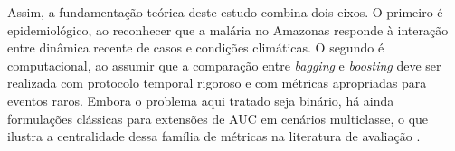 Assim, a fundamenta\c{c}\~ao te\'orica deste estudo combina dois eixos. O primeiro \'e epidemiol\'ogico, ao reconhecer que a mal\'aria no Amazonas responde \`a intera\c{c}\~ao entre din\^amica recente de casos e condi\c{c}\~oes clim\'aticas. O segundo \'e computacional, ao assumir que a compara\c{c}\~ao entre \textit{bagging} e \textit{boosting} deve ser realizada com protocolo temporal rigoroso e com m\'etricas apropriadas para eventos raros. Embora o problema aqui tratado seja bin\'ario, h\'a ainda formula\c{c}\~oes cl\'assicas para extens\~oes de AUC em cen\'arios multiclasse, o que ilustra a centralidade dessa fam\'ilia de m\'etricas na literatura de avalia\c{c}\~ao \cite{article}.
